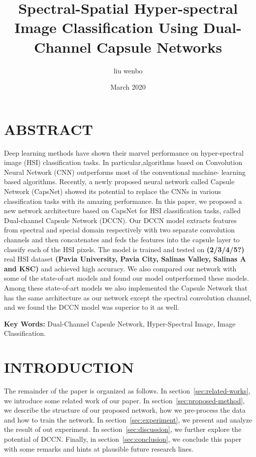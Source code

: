 \documentclass{article}
\title{Spectral-Spatial Hyper-spectral Image Classification Using Dual-Channel Capsule Networks}
\author{liu wenbo}
\date{March 2020}
\begin{document}
	\maketitle


	\section{ABSTRACT}\label{sec:abstract}
	Deep learning methods have shown their marvel performance on hyper-spectral image (HSI) classification tasks.
	In particular,algorithms based on Convolution Neural Network (CNN) outperforms most of the conventional machine-
	learning based algorithms.
	Recently, a newly proposed neural network called Capsule Network (CapsNet) showed its potential to replace the CNNs
	in various classification tasks with its amazing performance.
	In this paper, we proposed a new network architecture based on CapsNet for HSI classification tasks, called
	Dual-channel Capsule Network (DCCN).
	Our DCCN model extracts features from spectral and special domain respectively with two separate convolution
	channels and then concatenates and feds the features into the capsule layer to classify each of the HSI pixels.
	The model is trained and tested on \textbf{(2/3/4/5?)} real HSI dataset \textbf{(Pavia University, Pavia City,
	Salinas Valley, Salinas A and KSC)} and achieved high accuracy.
	We also compared our network with some of the state-of-art models and found our model outperformed these models.
	Among these state-of-art models we also implemented the Capsule Network that has the same architecture as our
	network except the spectral convolution channel, and we found the DCCN model was superior to it as well.

	\noindent \textbf{Key Words:} Dual-Channel Capsule Network, Hyper-Spectral Image, Image Classification.


	\section{INTRODUCTION}\label{sec:introduction}

	The remainder of the paper is organized as follows.
	In section~\ref{sec:related-works}, we introduce some related work of our paper.
	In section~\ref{sec:proposed-method}, we describe the structure of our proposed network, how we pre-process the data and how
	to train the network.
	In section~\ref{sec:experiment}, we present and analyze the result of out experiment.
	In section~\ref{sec:discussion}, we further explore the potential of DCCN\@.
	Finally, in section~\ref{sec:conclusion}, we  conclude this paper with some remarks and hints at plausible future research
	lines.
\end{document}
